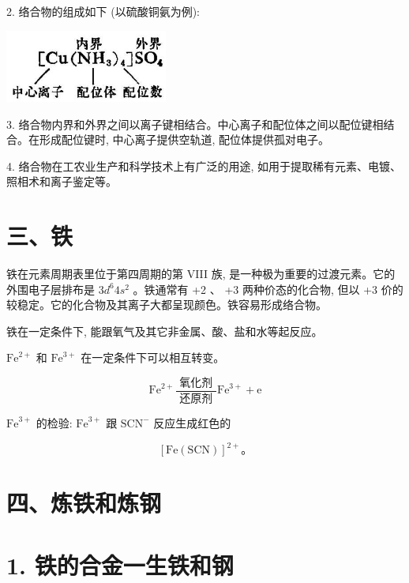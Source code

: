 \documentclass[10pt]{article}
\begin{document}
2. 络合物的组成如下 (以硫酸铜氨为例):

\begin{center}
\includegraphics[max width=0.4\textwidth]{images/01912d16-be99-77bb-9535-4f3ed8d9946f_43_565194.jpg}
\end{center}

3. 络合物内界和外界之间以离子键相结合。中心离子和配位体之间以配位键相结合。在形成配位键时, 中心离子提供空轨道, 配位体提供孤对电子。

4. 络合物在工农业生产和科学技术上有广泛的用途, 如用于提取稀有元素、电镀、照相术和离子鉴定等。

\section*{三、铁}

铁在元素周期表里位于第四周期的第 VIII 族, 是一种极为重要的过渡元素。它的外围电子层排布是 \(3{d}^{6}4{s}^{2}\) 。铁通常有 +2 、 +3 两种价态的化合物, 但以 +3 价的较稳定。它的化合物及其离子大都呈现颜色。铁容易形成络合物。

铁在一定条件下, 能跟氧气及其它非金属、酸、盐和水等起反应。

\({\mathrm{{Fe}}}^{2 + }\) 和 \({\mathrm{{Fe}}}^{3 + }\) 在一定条件下可以相互转变。

\[
{\mathrm{{Fe}}}^{2 + }\frac{\text{ 氧化剂 }}{\text{ 还原剂 }}{\mathrm{{Fe}}}^{3 + } + \mathrm{e}
\]

\({\mathrm{{Fe}}}^{3 + }\) 的检验: \({\mathrm{{Fe}}}^{3 + }\) 跟 \({\mathrm{{SCN}}}^{ - }\) 反应生成红色的

\[
{\left\lbrack \mathrm{{Fe}}\left( \mathrm{{SCN}}\right) \right\rbrack }^{2 + }\text{。}
\]

\section*{四、炼铁和炼钢}

\section*{1. 铁的合金一生铁和钢}

\begin{center}
\end{center}
\end{document}
